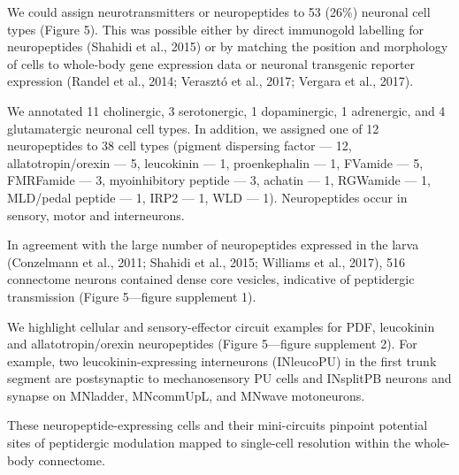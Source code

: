 \documentclass[
  11pt,
]{article}
\begin{document}
We could assign neurotransmitters or neuropeptides to 53 (26\%) neuronal
cell types (Figure 5). This was possible either by direct immunogold
labelling for neuropeptides (Shahidi et al., 2015) or by matching the
position and morphology of cells to whole-body gene expression data or
neuronal transgenic reporter expression (Randel et al., 2014; Verasztó
et al., 2017; Vergara et al., 2017).

We annotated 11 cholinergic, 3 serotonergic, 1 dopaminergic, 1
adrenergic, and 4 glutamatergic neuronal cell types. In addition, we
assigned one of 12 neuropeptides to 38 cell types (pigment dispersing
factor --- 12, allatotropin/orexin --- 5, leucokinin --- 1,
proenkephalin --- 1, FVamide --- 5, FMRFamide --- 3, myoinhibitory
peptide --- 3, achatin --- 1, RGWamide --- 1, MLD/pedal peptide --- 1,
IRP2 --- 1, WLD --- 1). Neuropeptides occur in sensory, motor and
interneurons.

In agreement with the large number of neuropeptides expressed in the
larva (Conzelmann et al., 2011; Shahidi et al., 2015; Williams et al.,
2017), 516 connectome neurons contained dense core vesicles, indicative
of peptidergic transmission (Figure 5---figure supplement 1).

We highlight cellular and sensory-effector circuit examples for PDF,
leucokinin and allatotropin/orexin neuropeptides (Figure 5---figure
supplement 2). For example, two leucokinin-expressing interneurons
(INleucoPU) in the first trunk segment are postsynaptic to
mechanosensory PU cells and INsplitPB neurons and synapse on MNladder,
MNcommUpL, and MNwave motoneurons.

These neuropeptide-expressing cells and their mini-circuits pinpoint
potential sites of peptidergic modulation mapped to single-cell
resolution within the whole-body connectome.
\end{document}
